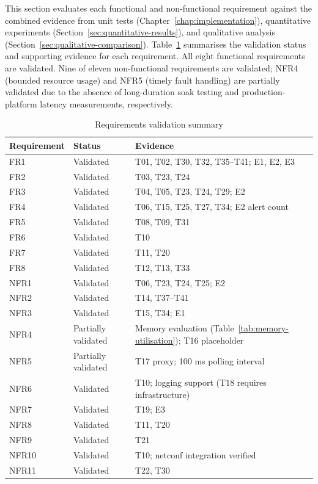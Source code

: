 This section evaluates each functional and non-functional requirement against the combined evidence from unit tests (Chapter~\ref{chap:implementation}), quantitative experiments (Section~\ref{sec:quantitative-results}), and qualitative analysis (Section~\ref{sec:qualitative-comparison}). Table~\ref{tab:req-validation} summarises the validation status and supporting evidence for each requirement. All eight functional requirements are validated. Nine of eleven non-functional requirements are validated; NFR4 (bounded resource usage) and NFR5 (timely fault handling) are partially validated due to the absence of long-duration soak testing and production-platform latency measurements, respectively.
\FloatBarrier
\begin{table}[htbp]
\centering
\caption{Requirements validation summary}
\label{tab:req-validation}
\begin{tabular}{p{2cm} p{3cm} p{8cm}}
\toprule
\textbf{Requirement} & \textbf{Status} & \textbf{Evidence} \\
\midrule
FR1 & Validated & T01, T02, T30, T32, T35--T41; E1, E2, E3 \\
FR2 & Validated & T03, T23, T24 \\
FR3 & Validated & T04, T05, T23, T24, T29; E2 \\
FR4 & Validated & T06, T15, T25, T27, T34; E2 alert count \\
FR5 & Validated & T08, T09, T31 \\
FR6 & Validated & T10 \\
FR7 & Validated & T11, T20 \\
FR8 & Validated & T12, T13, T33 \\
NFR1 & Validated & T06, T23, T24, T25; E2 \\
NFR2 & Validated & T14, T37--T41 \\
NFR3 & Validated & T15, T34; E1 \\
NFR4 & Partially validated & Memory evaluation (Table~\ref{tab:memory-utilisation}); T16 placeholder \\
NFR5 & Partially validated & T17 proxy; 100 ms polling interval \\
NFR6 & Validated & T10; logging support (T18 requires infrastructure) \\
NFR7 & Validated & T19; E3 \\
NFR8 & Validated & T11, T20 \\
NFR9 & Validated & T21 \\
NFR10 & Validated & T10; \gls{netconf} integration verified \\
NFR11 & Validated & T22, T30 \\
\bottomrule
\end{tabular}
\end{table}


